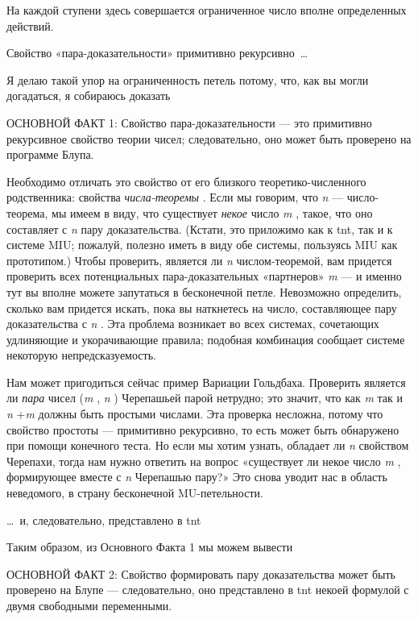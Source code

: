 \documentclass[../main.tex]{subfiles}
\begin{document}
На каждой ступени здесь совершается ограниченное число вполне определенных действий.

Свойство «пара-доказательности» примитивно рекурсивно~\ldots{}

Я делаю такой упор на ограниченность петель потому, что, как вы могли догадаться, я собираюсь доказать

ОСНОВНОЙ ФАКТ 1: Свойство пара-доказательности --- это примитивно рекурсивное свойство теории чисел; следовательно, оно может быть проверено на программе Блупа.

Необходимо отличать это свойство от его близкого теоретико-численного родственника: свойства \emph{числа-теоремы} . Если мы говорим, что \emph{n} --- число-теорема, мы имеем в виду, что существует \emph{некое} число \emph{m} , такое, что оно составляет с \emph{n} пару доказательства. (Кстати, это приложимо как к \acs{tnt}, так и к системе MIU; пожалуй, полезно иметь в виду обе системы, пользуясь MIU как прототипом.) Чтобы проверить, является ли \emph{n} числом-теоремой, вам придется проверить всех потенциальных пара-доказательных «партнеров» \emph{m} --- и именно тут вы вполне можете запутаться в бесконечной петле. Невозможно определить, сколько вам придется искать, пока вы наткнетесь на число, составляющее пару доказательства с \emph{n} . Эта проблема возникает во всех системах, сочетающих удлиняющие и укорачивающие правила; подобная комбинация сообщает системе некоторую непредсказуемость.

Нам может пригодиться сейчас пример Вариации Гольдбаха. Проверить является ли \emph{пара} чисел (\emph{m} , \emph{n} ) Черепашьей парой нетрудно; это значит, что как \emph{m} так и \emph{n} +\emph{m} должны быть простыми числами. Эта проверка несложна, потому что свойство простоты --- примитивно рекурсивно, то есть может быть обнаружено при помощи конечного теста. Но если мы хотим узнать, обладает ли \emph{n} свойством Черепахи, тогда нам нужно ответить на вопрос «существует ли некое число \emph{m} , формирующее вместе с \emph{n} Черепашью пару?» Это снова уводит нас в область неведомого, в страну бесконечной MU-петельности.

\ldots~и, следовательно, представлено в \acs{tnt}

Таким образом, из Основного Факта 1 мы можем вывести

ОСНОВНОЙ ФАКТ 2: Свойство формировать пару доказательства может быть проверено на Блупе --- следовательно, оно представлено в \acs{tnt} некоей формулой с двумя свободными переменными.
\end{document}
